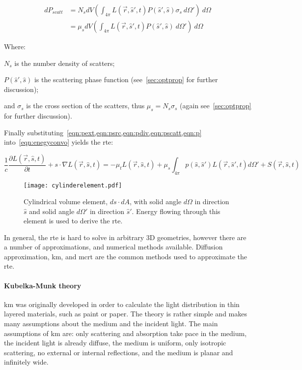 \begin{align}
	dP_{scatt}&=N_sdV\left(\int_{4\pi}L(\vec{r},\hat{s}',t)P(\hat{s}',\hat{s})\sigma_s\ d\Omega' \right)\ d\Omega \\
			  &=\mu_sdV\left(\int_{4\pi}L(\vec{r},\hat{s}',t)P(\hat{s}',\hat{s})\ d\Omega' \right)\ d\Omega 
			  \label{eqn:pscatt}
\end{align}

\noindent Where:

\indent $N_s$ is the number density of scatters;

\indent $P(\hat{s}',\hat{s})$ is the scattering phase function (see~\cref{sec:optprop} for further discussion);

\indent and $\sigma_s$ is the cross section of the scatters, thus $\mu_s=N_s\sigma_s$ (again see~\cref{sec:optprop} for further discussion).

\medskip


Finally substituting~\cref{eqn:pext,eqn:psrc,eqn:pdiv,eqn:pscatt,eqn:p} into~\cref{eqn:enegyconvo} yields the \gls{rte}:

\begin{equation}
\frac{1}{c}\frac{\partial L(\vec{r},\hat{s},t)}{\partial t} + s\cdot \nabla L(\vec{r},\hat{s},t)=-\mu_tL(\vec{r},\hat{s},t)+\mu_s\int_{4\pi}p(\hat{s},\hat{s}')L(\vec{r},\hat{s}',t)d\Omega' + S(\vec{r},\hat{s},t)
\label{eqn:rte}
\end{equation}

\begin{figure}[!htb]
	\centering
	\texttt{[image: cylinderelement.pdf]}
	\caption{Cylindrical volume element, $ds \cdot dA$, with solid angle $d\Omega$ in direction $\hat{s}$ and solid angle $d\Omega'$ in direction $\hat{s}'$. Energy flowing through this element is used to derive the \gls{rte}.}
	\label{fig:energydiag2}
\end{figure}



In general, the \gls{rte} is hard to solve in arbitrary 3D geometries, however there are a number of approximations, and numerical methods available. Diffusion approximation, \gls{km}, and \gls{mcrt} are the common methods used to approximate the \gls{rte}.

\paragraph{Kubelka-Munk theory}
\gls{km} was originally developed in order to calculate the light distribution in thin layered materials, such as paint or paper. The theory is rather simple and makes many assumptions about the medium and the incident light. The main assumptions of \gls{km} are: only scattering and absorption take pace in the medium, the incident light is already diffuse, the medium is uniform, only isotropic scattering, no external or internal reflections, and the medium is planar and infinitely wide.

